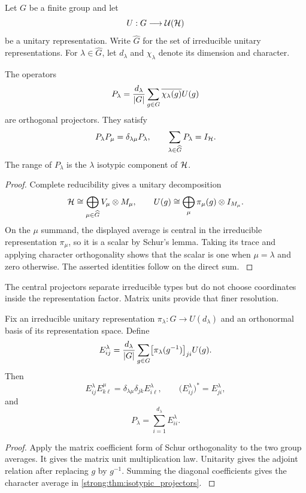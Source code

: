 Let \(G\) be a finite group and let
\[
U:G\longrightarrow\mathcal U(\mathcal H)
\]
be a unitary representation. Write \(\widehat G\) for the set of irreducible unitary representations. For \(\lambda\in\widehat G\), let \(d_\lambda\) and \(\chi_\lambda\) denote its dimension and character.

\begin{theorem}\label{strong:theorem:003}\label{strong:thm:isotypic_projectors}
The operators
\[
P_\lambda
=
\frac{d_\lambda}{\left\lvert G\right\rvert}
\sum_{g\in G}
\overline{\chi_\lambda(g)}U(g)
\]
are orthogonal projectors. They satisfy
\[
P_\lambda P_\mu=\delta_{\lambda\mu}P_\lambda,
\qquad
\sum_{\lambda\in\widehat G}P_\lambda=I_{\mathcal H}.
\]
The range of \(P_\lambda\) is the \(\lambda\) isotypic component of \(\mathcal H\).
\end{theorem}

\begin{proof}\label{strong:proof:005}
Complete reducibility gives a unitary decomposition
\[
\mathcal H
\cong
\bigoplus_{\mu\in\widehat G}
V_\mu\otimes M_\mu,
\qquad
U(g)
\cong
\bigoplus_\mu
\pi_\mu(g)\otimes I_{M_\mu}.
\]
On the \(\mu\) summand, the displayed average is central in the irreducible representation \(\pi_\mu\), so it is a scalar by Schur's lemma. Taking its trace and applying character orthogonality shows that the scalar is one when \(\mu=\lambda\) and zero otherwise. The asserted identities follow on the direct sum.
\label{strong:proof:005:end}\end{proof}

The central projectors separate irreducible types but do not choose coordinates inside the representation factor. Matrix units provide that finer resolution.

\begin{theorem}\label{strong:theorem:004}\label{strong:thm:representation_matrix_units}
Fix an irreducible unitary representation \(\pi_\lambda:G\to U(d_\lambda)\) and an orthonormal basis of its representation space. Define
\[
E_{ij}^{\lambda}
=
\frac{d_\lambda}{\left\lvert G\right\rvert}
\sum_{g\in G}
\bigl[\pi_\lambda(g^{-1})\bigr]_{ji}U(g).
\]
Then
\[
E_{ij}^{\lambda}E_{k\ell}^{\mu}
=
\delta_{\lambda\mu}\delta_{jk}E_{i\ell}^{\lambda},
\qquad
\bigl(E_{ij}^{\lambda}\bigr)^*=E_{ji}^{\lambda},
\]
and
\[
P_\lambda=\sum_{i=1}^{d_\lambda}E_{ii}^{\lambda}.
\]
\end{theorem}

\begin{proof}\label{strong:proof:006}
Apply the matrix coefficient form of Schur orthogonality to the two group averages. It gives the matrix unit multiplication law. Unitarity gives the adjoint relation after replacing \(g\) by \(g^{-1}\). Summing the diagonal coefficients gives the character average in \cref{strong:thm:isotypic_projectors}.
\label{strong:proof:006:end}\end{proof}

